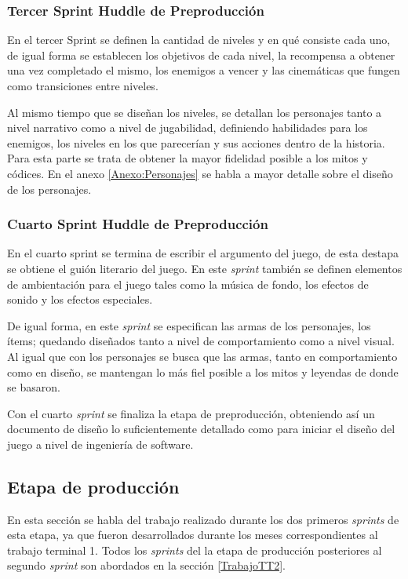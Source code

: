 \subsubsection{Tercer Sprint Huddle de Preproducción}
En el tercer Sprint se definen la cantidad de niveles y en qué consiste
cada uno, de igual forma se establecen los objetivos de cada nivel, la recompensa
a obtener una vez completado el mismo, los enemigos a vencer y las cinemáticas que
fungen como transiciones entre niveles.  
\\
\par
Al mismo tiempo que se diseñan los niveles, se detallan los
personajes tanto a nivel narrativo como a nivel de jugabilidad, definiendo habilidades
para los enemigos, los niveles en los que parecerían y sus acciones dentro de
la historia. Para esta parte se trata de obtener la mayor fidelidad posible a
los mitos y códices. En el anexo \ref{Anexo:Personajes} se habla a mayor detalle
sobre el diseño de los personajes.

\subsubsection{Cuarto Sprint Huddle de Preproducción}
En el cuarto sprint se termina de escribir el argumento del juego, de esta
destapa se obtiene el guión literario del juego. En este \textit{sprint} también se definen
elementos de ambientación para el juego tales como la música de fondo, los
efectos de sonido y los efectos especiales.
\\
\par
De igual forma, en este \textit{sprint} se especifican las armas de los personajes, los
ítems; quedando diseñados tanto a nivel de comportamiento como a nivel
visual. Al igual que con los personajes se busca que las armas, tanto en
comportamiento como en diseño, se mantengan lo más fiel posible a los mitos
y leyendas de donde se basaron.
\\
\par
Con el cuarto \textit{sprint} se finaliza la etapa de preproducción, obteniendo así un
documento de diseño lo suficientemente detallado como para iniciar el diseño
del juego a nivel de ingeniería de software.

\subsection{Etapa de producción}
En esta sección se habla del trabajo realizado durante los dos primeros
\textit{sprints} de esta etapa, ya que fueron desarrollados durante los meses
correspondientes al trabajo terminal 1. Todos los \textit{sprints} del la etapa
de producción posteriores al segundo \textit{sprint} son abordados en la sección
\ref{TrabajoTT2}.

